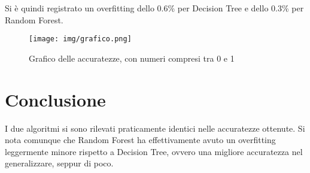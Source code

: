 \documentclass[]{article}
\begin{document}
Si è quindi registrato un overfitting dello 0.6\% per Decision Tree e dello 0.3\% per Random Forest.

\begin{figure}[H]
	\texttt{[image: img/grafico.png]}
	\caption{Grafico delle accuratezze, con numeri compresi tra 0 e 1}
	\label{imgGrafico}
\end{figure}



\section*{Conclusione}
I due algoritmi si sono rilevati praticamente identici nelle accuratezze ottenute. Si nota comunque che Random Forest ha effettivamente avuto un overfitting leggermente minore rispetto a Decision Tree, ovvero una migliore accuratezza nel generalizzare, seppur di poco.
\end{document}
